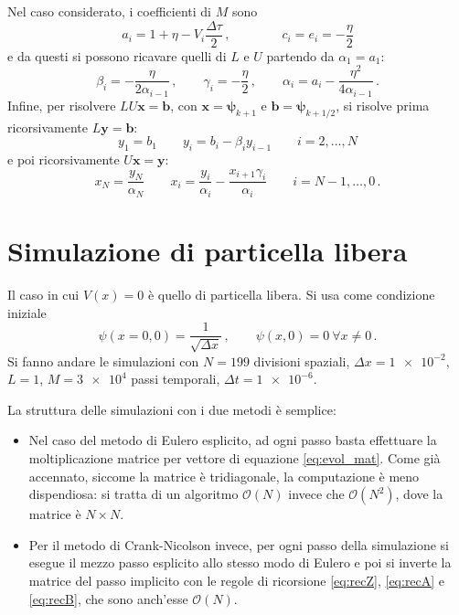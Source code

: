 \documentclass[a4paper, titlepage]{article}
\begin{document}
Nel caso considerato, i coefficienti di $M$ sono
\begin{equation*}
    a_i = 1 + \eta - V_i \frac{\Delta\tau}{2}\, , \qquad\qquad
    c_i = e_i = -\frac{\eta}{2}
\end{equation*}
e da questi si possono ricavare quelli di $L$ e $U$ partendo da $\alpha_1 = a_1$:
\begin{equation}
    \beta_i = -\frac{\eta}{2\alpha_{i-1}}\, ,
    \qquad
    \gamma_i = -\frac{\eta}{2}\, ,
    \qquad
    \alpha_i = a_i - \frac{\eta^2}{4\alpha_{i-1}}\, .
    \label{eq:recZ}
\end{equation}
Infine, per risolvere $LU\mathbf{x} = \mathbf{b}$, con $\mathbf{x} = \bm{\psi}_{k+1}$ e $\mathbf{b} = \bm{\psi}_{k+1/2}$, si risolve prima ricorsivamente $L\mathbf{y} = \mathbf{b}$:
\begin{equation}
    y_1 = b_1 \qquad y_i = b_i -\beta_i y_{i-1} \qquad i = 2,\dots,N
    \label{eq:recA}
\end{equation}
e poi ricorsivamente $U\mathbf{x} = \mathbf{y}$:
\begin{equation}
    x_N = \frac{y_N}{\alpha_N} \qquad x_i = \frac{y_i}{\alpha_i} - \frac{x_{i+1}\gamma_i}{\alpha_i} \qquad i = N-1,\dots,0\, .
    \label{eq:recB}
\end{equation}

\section{Simulazione di particella libera}
Il caso in cui $V(x) = 0$ è quello di particella libera. Si usa come condizione iniziale
\[
    \psi(x = 0, 0) = \frac{1}{\sqrt{\Delta x}}\, ,
    \qquad
    \psi(x,0) = 0\ \forall x \neq 0\, .
\]
Si fanno andare le simulazioni con $N = 199$ divisioni spaziali, $\Delta x = \num{1e-2}$, $L=1$, $M = \num{3e4}$ passi temporali, $\Delta t = \num{1e-6}$. 

La struttura delle simulazioni con i due metodi è semplice:
\begin{itemize}
    \item Nel caso del metodo di Eulero esplicito, ad ogni passo basta effettuare la moltiplicazione matrice per vettore di equazione \eqref{eq:evol_mat}. Come già accennato, siccome la matrice è tridiagonale, la computazione è meno dispendiosa: si tratta di un algoritmo $\mathcal{O}(N)$ invece che $\mathcal{O}(N^2)$, dove la matrice è $N\times N$.
    \item Per il metodo di Crank-Nicolson invece, per ogni passo della simulazione si esegue il mezzo passo esplicito allo stesso modo di Eulero e poi si inverte la matrice del passo implicito con le regole di ricorsione \eqref{eq:recZ}, \eqref{eq:recA} e \eqref{eq:recB}, che sono anch'esse $\mathcal{O}(N)$.
\end{itemize}
\end{document}

